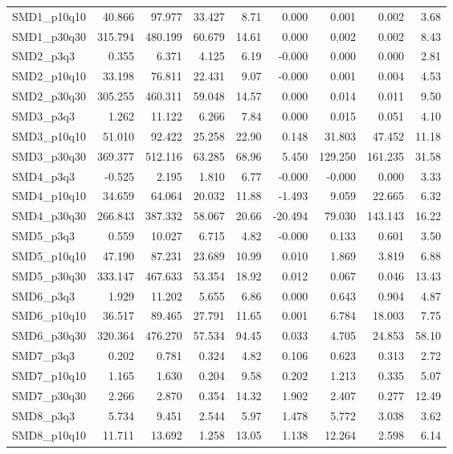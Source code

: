 \begin{longtable}{lrrrrrrrr}
SMD1\_p10q10 & 40.866 & 97.977 & 33.427 & 8.71 & 0.000 & 0.001 & 0.002 & 3.68 \\
SMD1\_p30q30 & 315.794 & 480.199 & 60.679 & 14.61 & 0.000 & 0.002 & 0.002 & 8.43 \\
SMD2\_p3q3 & 0.355 & 6.371 & 4.125 & 6.19 & -0.000 & 0.000 & 0.000 & 2.81 \\
SMD2\_p10q10 & 33.198 & 76.811 & 22.431 & 9.07 & -0.000 & 0.001 & 0.004 & 4.53 \\
SMD2\_p30q30 & 305.255 & 460.311 & 59.048 & 14.57 & 0.000 & 0.014 & 0.011 & 9.50 \\
SMD3\_p3q3 & 1.262 & 11.122 & 6.266 & 7.84 & 0.000 & 0.015 & 0.051 & 4.10 \\
SMD3\_p10q10 & 51.010 & 92.422 & 25.258 & 22.90 & 0.148 & 31.803 & 47.452 & 11.18 \\
SMD3\_p30q30 & 369.377 & 512.116 & 63.285 & 68.96 & 5.450 & 129.250 & 161.235 & 31.58 \\
SMD4\_p3q3 & -0.525 & 2.195 & 1.810 & 6.77 & -0.000 & -0.000 & 0.000 & 3.33 \\
SMD4\_p10q10 & 34.659 & 64.064 & 20.032 & 11.88 & -1.493 & 9.059 & 22.665 & 6.32 \\
SMD4\_p30q30 & 266.843 & 387.332 & 58.067 & 20.66 & -20.494 & 79.030 & 143.143 & 16.22 \\
SMD5\_p3q3 & 0.559 & 10.027 & 6.715 & 4.82 & -0.000 & 0.133 & 0.601 & 3.50 \\
SMD5\_p10q10 & 47.190 & 87.231 & 23.689 & 10.99 & 0.010 & 1.869 & 3.819 & 6.88 \\
SMD5\_p30q30 & 333.147 & 467.633 & 53.354 & 18.92 & 0.012 & 0.067 & 0.046 & 13.43 \\
SMD6\_p3q3 & 1.929 & 11.202 & 5.655 & 6.86 & 0.000 & 0.643 & 0.904 & 4.87 \\
SMD6\_p10q10 & 36.517 & 89.465 & 27.791 & 11.65 & 0.001 & 6.784 & 18.003 & 7.75 \\
SMD6\_p30q30 & 320.364 & 476.270 & 57.534 & 94.45 & 0.033 & 4.705 & 24.853 & 58.10 \\
SMD7\_p3q3 & 0.202 & 0.781 & 0.324 & 4.82 & 0.106 & 0.623 & 0.313 & 2.72 \\
SMD7\_p10q10 & 1.165 & 1.630 & 0.204 & 9.58 & 0.202 & 1.213 & 0.335 & 5.07 \\
SMD7\_p30q30 & 2.266 & 2.870 & 0.354 & 14.32 & 1.902 & 2.407 & 0.277 & 12.49 \\
SMD8\_p3q3 & 5.734 & 9.451 & 2.544 & 5.97 & 1.478 & 5.772 & 3.038 & 3.62 \\
SMD8\_p10q10 & 11.711 & 13.692 & 1.258 & 13.05 & 1.138 & 12.264 & 2.598 & 6.14 \\

\end{longtable}
